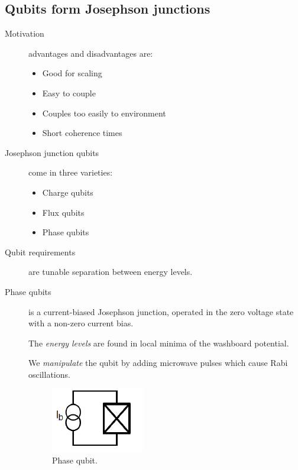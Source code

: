 \subsection{Qubits form Josephson junctions}
\begin{description}
\item[Motivation] advantages and disadvantages are:
\begin{itemize}
\item Good for scaling
\item Easy to couple 
\item Couples too easily to environment
\item Short coherence times
\end{itemize}

\item[Josephson junction qubits] come in three varieties:
\begin{itemize}
\item Charge qubits
\item Flux qubits
\item Phase qubits
\end{itemize}


\item[Qubit requirements] are tunable separation between energy levels. 


\item[Phase qubits] is a current-biased Josephson junction, operated in the zero voltage state with a non-zero current bias. 

The \emph{energy levels} are found in local minima of the washboard potential. 

We \emph{manipulate} the qubit by adding microwave pulses which cause Rabi oscillations. 

\begin{figure}[h]
  \caption{Phase qubit.}
  \centering
    \includegraphics[width=\textwidth]{./SC_figures/Phase_Qubit.PNG}
\end{figure}


\end{description}
